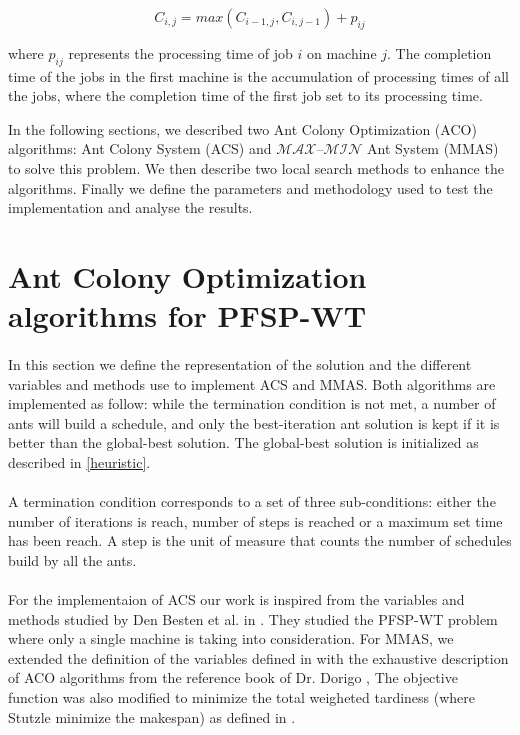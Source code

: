 \documentclass[runningheads]{llncs}
\begin{document}
\begin{equation}
  C_{i,j} = max(C_{i-1,j}, C_{i, j-1}) + p_{ij}
\end{equation}

where $p_{ij}$ represents the processing time of job $i$ on machine $j$. The completion time of the jobs in the first machine is the accumulation of processing times of all the jobs, where the completion time of the first job set to its processing time.

In the following sections, we described two Ant Colony Optimization (ACO) algorithms: Ant Colony System (ACS) and  $\mathcal{MAX – MIN}$ Ant System (MMAS) to solve this problem. We then describe two local search methods to enhance the algorithms. Finally we define the parameters and methodology used to test the implementation and analyse the results.

\section{Ant Colony Optimization algorithms for PFSP-WT}

\paragraph{}

In this section we define the representation of the solution and the different variables and methods use to implement ACS and MMAS. Both algorithms are implemented as follow: while the termination condition is not met, a number of ants will build a schedule, and only the best-iteration ant solution is kept if it is better than the global-best solution. The global-best solution is initialized as described in \ref{heuristic}.

\paragraph{}

A termination condition corresponds to a set of three sub-conditions: either the number of iterations is reach, number of steps is reached or a maximum set time has been reach. A step is the unit of measure that counts the number of schedules build by all the ants.


\paragraph{}

For the implementaion of ACS our work is inspired from the variables and methods studied by Den Besten et al. in \cite{den_besten_ant_2000}. They studied the PFSP-WT problem where only a single machine is taking into consideration. For MMAS, we extended the definition of the variables defined in \cite{stutzle_ant_1997} with the exhaustive description of ACO algorithms from the reference book of  Dr. Dorigo \cite{dorigo_ant_2004}, The objective function was also modified to minimize the total weigheted tardiness (where Stutzle minimize the makespan) as defined in \cite{den_besten_ant_2000}.
\end{document}
